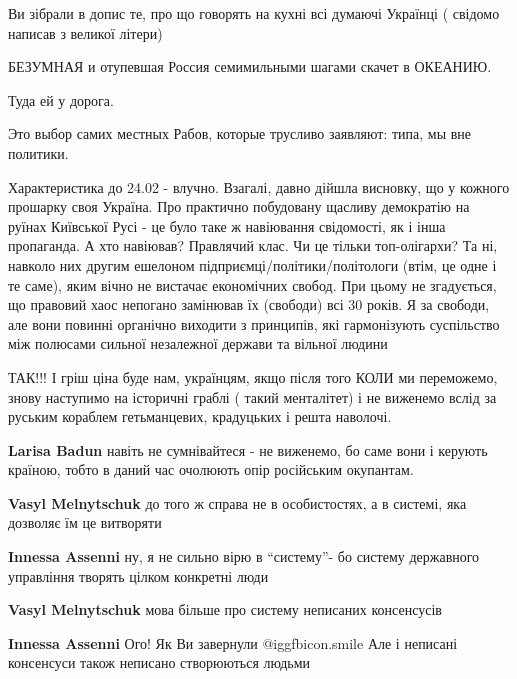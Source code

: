 \begin{itemize}
Ви зібрали в допис те, про що говорять на кухні всі думаючі Українці ( свідомо
написав з великої літери)


БЕЗУМНАЯ и отупевшая Россия семимильными шагами скачет в ОКЕАНИЮ.

Туда ей у дорога.

Это выбор самих местных Рабов, которые трусливо заявляют: типа, мы вне
политики.


Характеристика до 24.02 - влучно. Взагалі, давно дійшла висновку, що у кожного
прошарку своя Україна. Про практично побудовану щасливу демократію на руїнах
Київської Русі - це було таке ж навіювання свідомості, як і інша пропаганда. А
хто навіював? Правлячий клас. Чи це тільки топ-олігархи? Та ні, навколо них
другим ешелоном підприємці/політики/політологи (втім, це одне і те саме), яким
вічно не вистачає економічних свобод. При цьому не згадується, що правовий хаос
непогано замінював їх (свободи) всі 30 років. Я за свободи, але вони повинні
органічно виходити з принципів, які гармонізують суспільство між полюсами
сильної незалежної держави та вільної людини


ТАК!!! І гріш ціна буде нам, українцям, якщо після того КОЛИ ми переможемо,
знову наступимо на історичні граблі ( такий менталітет) і не виженемо вслід за
руським кораблем гетьманцевих, крадуцьких і решта наволочі.

\begin{itemize} %
\textbf{Larisa Badun} навіть не сумнівайтеся - не виженемо, бо саме вони і керують країною, тобто в даний час очолюють опір російським окупантам.

\textbf{Vasyl Melnytschuk} до того ж справа не в особистостях, а в системі, яка дозволяє їм це витворяти

\textbf{Innessa Assenni} ну, я не сильно вірю в \enquote{систему}- бо систему державного управління творять цілком конкретні люди

\textbf{Vasyl Melnytschuk} мова більше про систему неписаних консенсусів

\textbf{Innessa Assenni} Ого! Як Ви завернули  @igg{fbicon.smile} 
Але і неписані консенсуси також неписано створюються людьми

\end{itemize} %


\end{itemize}
